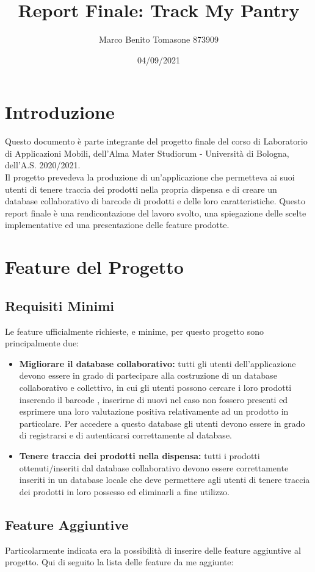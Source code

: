 \documentclass[11pt]{article}
\title{Report Finale: Track My Pantry}
\author{Marco Benito Tomasone 873909}
\date{04/09/2021}
\begin{document}
\maketitle
\section{Introduzione}
    Questo documento è parte integrante del progetto finale del corso di Laboratorio di Applicazioni Mobili, dell'Alma Mater Studiorum - 
    Università di Bologna, dell'A.S. 2020/2021. \\
    Il progetto prevedeva la produzione di un'applicazione che permetteva ai suoi utenti di tenere traccia dei prodotti nella propria dispensa 
    e di creare un database collaborativo di barcode di prodotti e delle loro caratteristiche.
    Questo report finale è una rendicontazione del lavoro svolto, una spiegazione delle scelte implementative ed una presentazione delle 
    feature prodotte.
\section{Feature del Progetto}
\subsection{Requisiti Minimi}
    Le feature ufficialmente richieste, e minime, per questo progetto sono principalmente due:
    \begin{itemize}
        \item \textbf{Migliorare il database collaborativo: } tutti gli utenti dell'applicazione devono essere in grado di partecipare alla
        costruzione di un database collaborativo e collettivo, in cui gli utenti possono cercare i loro prodotti inserendo il barcode , inserirne
        di nuovi nel caso non fossero presenti ed esprimere una loro valutazione positiva relativamente ad un prodotto in particolare. Per 
        accedere a questo database gli utenti devono essere in grado di registrarsi e di autenticarsi correttamente al database.
        \item \textbf{Tenere traccia dei prodotti nella dispensa: } tutti i prodotti ottenuti/inseriti dal database collaborativo devono essere correttamente
        inseriti in un database locale che deve permettere agli utenti di tenere traccia dei prodotti in loro possesso ed eliminarli a fine utilizzo.
    \end{itemize}
\subsection{Feature Aggiuntive}
    Particolarmente indicata era la possibilità di inserire delle feature aggiuntive al progetto. Qui di seguito la lista delle feature da me aggiunte:
\end{document}
